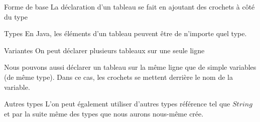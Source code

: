 \begin{frame}{Forme de base}
    \pause
    La déclaration d'un tableau se fait en ajoutant des crochets à côté du type
    

    \pause
    \begin{exampleblock}{Types}
        En Java, les éléments d'un tableau peuvent être de n'importe quel type.
    \end{exampleblock}

    

\end{frame}

\begin{frame}{Variantes}
    \pause
    On peut déclarer plusieurs tableaux sur une seule ligne
    

    \pause
    Nous pouvons aussi déclarer un tableau sur la même ligne que de simple variables (de même type).
    Dans ce cas, les crochets se mettent derrière le nom de la variable.
    
\end{frame}

\begin{frame}{Autres types}
    \pause
    L'on peut également utiliser d'autres types référence tel que $String$ et par la suite même des types que nous aurons nous-même crée.

    
\end{frame}